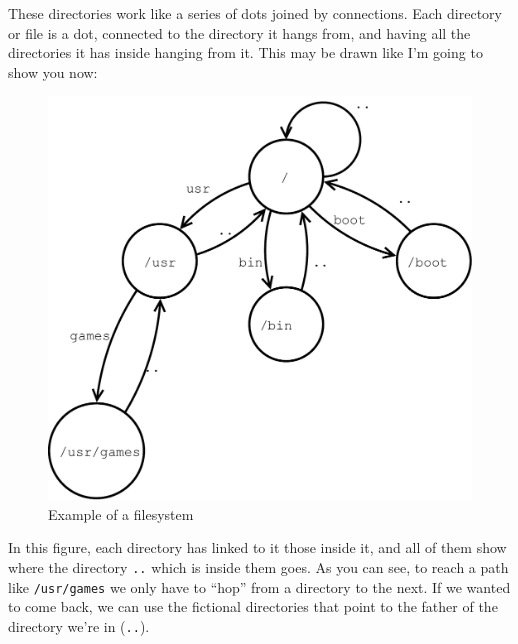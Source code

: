 \documentclass[a4paper]{article}
\begin{document}
These directories work like a series of dots joined by connections. Each
directory or file is a dot, connected to the directory it hangs from, and
having all the directories it has inside hanging from it. This may be drawn
like I'm going to show you now:

\begin{figure}[H]
    \includegraphics[width=\linewidth]{filesystems}
    \caption{Example of a filesystem}
    \label{img:extensions}
\end{figure}

In this figure, each directory has linked to it those inside it, and all of them
show where the directory \verb!..! which is inside them goes. As you can see, to
reach a path like \verb!/usr/games! we only have to ``hop'' from a directory to
the next. If we wanted to come back, we can use the fictional directories that
point to the father of the directory we're in (\verb!..!).
\end{document}
